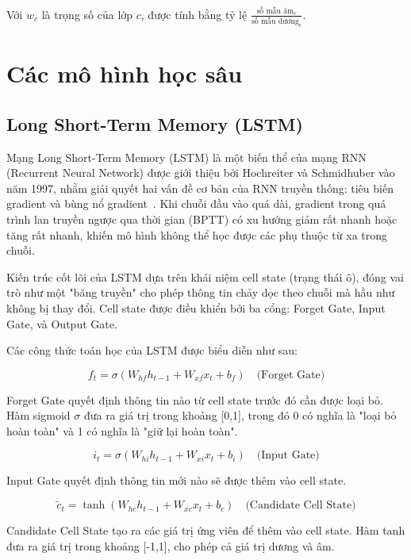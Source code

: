 \documentclass[../BTL.tex]{subfiles}
\begin{document}
Với $w_c$ là trọng số của lớp $c$, được tính bằng tỷ lệ $\frac{\text{số mẫu âm}_c}{\text{số mẫu dương}_c}$.

\section{Các mô hình học sâu}

\subsection{Long Short-Term Memory (LSTM)}
Mạng Long Short-Term Memory (LSTM) là một biến thể của mạng RNN (Recurrent Neural Network) được giới thiệu bởi Hochreiter và Schmidhuber vào năm 1997, nhằm giải quyết hai vấn đề cơ bản của RNN truyền thống: tiêu biến gradient và bùng nổ gradient~\cite{hochreiter1997lstm}. Khi chuỗi đầu vào quá dài, gradient trong quá trình lan truyền ngược qua thời gian (BPTT) có xu hướng giảm rất nhanh hoặc tăng rất nhanh, khiến mô hình không thể học được các phụ thuộc từ xa trong chuỗi.

Kiến trúc cốt lõi của LSTM dựa trên khái niệm cell state (trạng thái ô), đóng vai trò như một "băng truyền" cho phép thông tin chảy dọc theo chuỗi mà hầu như không bị thay đổi. Cell state được điều khiển bởi ba cổng: Forget Gate, Input Gate, và Output Gate.

Các công thức toán học của LSTM được biểu diễn như sau:

\begin{equation}
    f_t = \sigma(W_{hf} h_{t-1} + W_{xf} x_t + b_f) \quad \text{(Forget Gate)}
\end{equation}

Forget Gate quyết định thông tin nào từ cell state trước đó cần được loại bỏ. Hàm sigmoid $\sigma$ đưa ra giá trị trong khoảng [0,1], trong đó 0 có nghĩa là "loại bỏ hoàn toàn" và 1 có nghĩa là "giữ lại hoàn toàn".

\begin{equation}
    i_t = \sigma(W_{hi} h_{t-1} + W_{xi} x_t + b_i) \quad \text{(Input Gate)}
\end{equation}

Input Gate quyết định thông tin mới nào sẽ được thêm vào cell state.

\begin{equation}
    \tilde{c}_t = \tanh(W_{hc} h_{t-1} + W_{xc} x_t + b_c) \quad \text{(Candidate Cell State)}
\end{equation}

Candidate Cell State tạo ra các giá trị ứng viên để thêm vào cell state. Hàm tanh đưa ra giá trị trong khoảng [-1,1], cho phép cả giá trị dương và âm.
\end{document}
